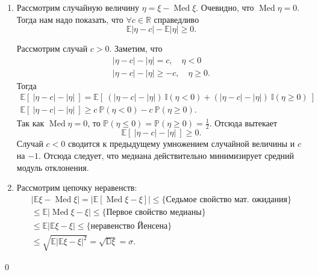 \documentclass[oneside,final,14pt]{extreport}
\renewenvironment{proof}{{\bfseries Доказательство.}}{\qed}
\theoremstyle{plain}
\theoremstyle{definition}
\theoremstyle{named}
\begin{document}
\begin{proof}
    \begin{enumerate}
        \item Рассмотрим случайную величину $\eta = \xi - \operatorname{Med}\xi$. Очевидно, что $\operatorname{Med} \eta = 0$. Тогда нам надо показать, что $\forall c \in \mathbb{R} $ справедливо 
        \begin{equation*}
            \mathbb{E} |\eta - c| - \mathbb{E}|\eta| \geqslant 0.
        \end{equation*}
        
        Рассмотрим случай $c > 0$. Заметим, что 
        \begin{gather*}
            |\eta - c| - |\eta| = c, \quad \eta < 0 \\
            |\eta - c| - |\eta|  \geqslant -c, \quad \eta \geqslant 0.
        \end{gather*}
        Тогда
        \begin{gather*}
            \mathbb{E} \left[~|\eta - c| - |\eta|~\right] = \mathbb{E} \left[~(|\eta - c| - |\eta|)~\mathbb{I}(\eta < 0) + (|\eta - c| - |\eta|)~\mathbb{I}(\eta \geqslant 0)~\right] \\
            \mathbb{E} \left[~|\eta - c| - |\eta|~\right] \geqslant c~\mathbb{P}(\eta < 0) - c~\mathbb{P}(\eta \geqslant 0).
        \end{gather*}
        Так как $\operatorname{Med}\eta = 0$, то $\mathbb{P}(\eta \leqslant 0) = \mathbb{P}(\eta \geqslant 0) = \frac{1}{2}$.
        Отсюда вытекает
        \begin{equation*}
            \mathbb{E}\left[~|\eta - c| - |\eta|~\right] \geqslant 0.
        \end{equation*}
        Случай $c < 0$ сводится к предыдущему умножением случайной величины и $c$ на $-1$. Отсюда следует, что медиана действительно минимизирует средний модуль отклонения.
        \item Рассмотрим цепочку неравенств:
        \begin{multline*}
            |\mathbb{E}\xi - \operatorname{Med}\xi| =
            |\mathbb{E}\left[ \operatorname{Med}\xi - \xi \right]| \leqslant 
            {\text{\{Седьмое свойство мат. ожидания\}}} \\ \leqslant \mathbb{E} |\operatorname{Med}\xi - \xi|
            \leqslant {\text{\{Первое свойство медианы\}}} \\ \leqslant
            \mathbb{E}| \mathbb{E}\xi - \xi| \leqslant
            {\text{\{неравенство Йенсена\}}} \\ 
            \leqslant
            \sqrt{\mathbb{E}| \mathbb{E}\xi - \xi|^2} = 
            \sqrt{\mathbb{D}\xi} = \sigma.
        \end{multline*}
    \end{enumerate}
\end{proof}
\end{document}
